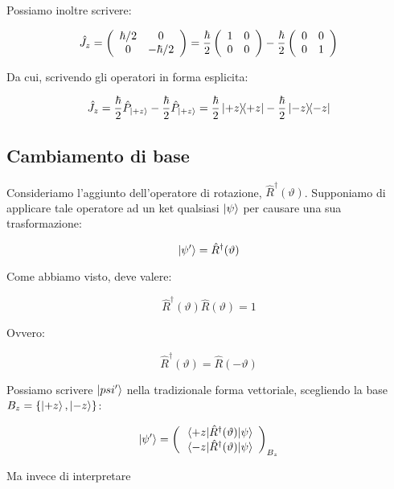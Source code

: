Possiamo inoltre scrivere:

	\begin{equation}
		\hat{J}_z = 
		\left( \begin{array}{c c}
				\hbar / 2 & 0 \\
				0 &  - \hbar / 2 \\ 
			\end{array}
		\right ) =
		\frac{\hbar}{2}
		\left( \begin{array}{c c}
				1 & 0 \\
				0 & 0 \\ 
			\end{array}
		\right ) -
		\frac{\hbar}{2}
		\left( \begin{array}{c c}
				0 & 0 \\
				0 & 1 \\ 
			\end{array}
		\right )
	\end{equation}

Da cui, scrivendo gli operatori in forma esplicita:

	\begin{equation}
		\hat{J}_z = \frac{\hbar}{2} \hat{P}_{\ket{+z}} - \frac{\hbar}{2} \hat{P}_{\ket{+z}} = \frac{\hbar}{2} \ketbra{+z}{+z} - \frac{\hbar}{2} \ketbra{-z}{-z}
	\end{equation}

\subsection{Cambiamento di base}

	Consideriamo l'aggiunto dell'operatore di rotazione, $\hat{R}^\dagger(\vartheta)$. Supponiamo di applicare tale operatore ad un ket qualsiasi $\ket{\psi}$ per causare una sua trasformazione:

	\[
		\ket{\psi'} = \hat{R}^\dagger(\vartheta)
	\]

Come abbiamo visto, deve valere:

	\begin{equation}
		\hat{R}^\dagger(\vartheta) \hat{R}(\vartheta) = 1
	\end{equation}

Ovvero:

	\begin{equation}
		\hat{R}^\dagger(\vartheta) = \hat{R} ( -\vartheta )
	\end{equation}

Possiamo scrivere $\ket{psi'}$ nella tradizionale forma vettoriale, scegliendo la base $B_z = \{ \ket{+z}, \ket{-z} \} $:

	\begin{equation}
		\ket{\psi'} =
			\left ( \begin{array}{c}
				\mel{+z}{\hat{R}^\dagger(\vartheta)}{\psi} \\
				\mel{-z}{\hat{R}^\dagger(\vartheta)}{\psi}
			\end{array} \right )_{B_z}
	\end{equation}

Ma invece di interpretare
